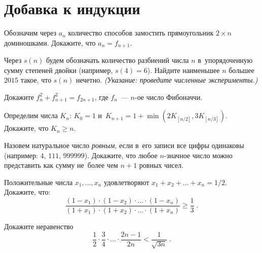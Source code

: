 
\section*{Добавка к индукции}


\begin{problems}

\item
Обозначим через $a_n$ количество способов замостить прямоугольник $2 \times n$
доминошками.
Докажите, что $a_n = f_{n+1}$.

\item
Через $s(n)$ будем обозначать количество разбиений числа $n$ в~упорядоченную
сумму степеней двойки (например, $s(4) = 6$).
Найдите наименьшее $n$ большее $2015$ такое, что $s(n)$ нечетно.
\emph{(Указание: проведите численные эксперименты.)}

\item
Докажите $f_{n}^{2} + f_{n + 1}^{2} = f_{2n + 1}$,
где $f_n$~--- $n$-ое число Фибоначчи.

\item
Определим числа $K_n$:
$K_0 = 1$
и~\(
    K_{n + 1}
=
    1 + \min (2 K_{[n / 2]}, 3 K_{[n / 3]})
\).
Докажите, что $K_n \geq n$.

\item
Назовем натуральное число \emph{ровным}, если в~его записи все цифры одинаковы
(например: $4$, $111$, $999999$).
Докажите, что любое $n$-значное число можно представить как сумму не~более чем 
$n + 1$ ровных чисел.

\item
Положительные числа $x_1, \ldots, x_n$ удовлетворяют
$x_1 + x_2 + \ldots + x_n = 1 / 2$.
Докажите, что:
\[
    \frac
        {(1 - x_1) \cdot (1 - x_2) \cdot \ldots \cdot (1 - x_n)}
        {(1 + x_1) \cdot (1 + x_2) \cdot \ldots \cdot (1 + x_n)}
\geq
    \frac{1}{3}
\;.\]

\item
Докажите неравенство
\[
    \frac{1}{2} \cdot
    \frac{3}{4} \cdot
    \ldots \cdot
    \frac{2 n - 1}{2 n}
<
    \frac{1}{\sqrt{3 n}}
\;.\]

\end{problems}


